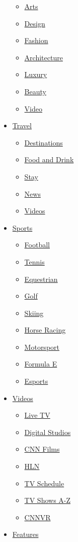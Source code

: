 \begin{itemize}
  \begin{itemize}
  \tightlist
  \item
    \href{/style/arts}{Arts}
  \item
    \href{/style/design}{Design}
  \item
    \href{/style/fashion}{Fashion}
  \item
    \href{/style/architecture}{Architecture}
  \item
    \href{/style/luxury}{Luxury}
  \item
    \href{/style/beauty}{Beauty}
  \item
    \href{/style/videos}{Video}
  \end{itemize}
\item
  \href{/travel}{Travel}

  \begin{itemize}
  \tightlist
  \item
    \href{/travel/destinations}{Destinations}
  \item
    \href{/travel/food-and-drink}{Food and Drink}
  \item
    \href{/travel/stay}{Stay}
  \item
    \href{/travel/news}{News}
  \item
    \href{/travel/videos}{Videos}
  \end{itemize}
\item
  \href{/sport}{Sports}

  \begin{itemize}
  \tightlist
  \item
    \href{/sport/football}{Football}
  \item
    \href{/sport/tennis}{Tennis}
  \item
    \href{/sport/equestrian}{Equestrian}
  \item
    \href{/sport/golf}{Golf}
  \item
    \href{/sport/skiing}{Skiing}
  \item
    \href{/sport/horse-racing}{Horse Racing}
  \item
    \href{/sport/motorsport}{Motorsport}
  \item
    \href{/specials/sport/formula-e}{Formula E}
  \item
    \href{/specials/esports}{Esports}
  \end{itemize}
\item
  \href{/videos}{Videos}

  \begin{itemize}
  \tightlist
  \item
    \href{//cnn.it/go2}{Live TV}
  \item
    \href{/specials/digital-studios}{Digital Studios}
  \item
    \href{/specials/videos/digital-shorts}{CNN Films}
  \item
    \href{/specials/videos/hln}{HLN}
  \item
    \href{/tv/schedule/cnn}{TV Schedule}
  \item
    \href{/specials/tv/all-shows}{TV Shows A-Z}
  \item
    \href{/vr}{CNNVR}
  \end{itemize}
\item
  \href{/specials}{Features}


\end{itemize}

